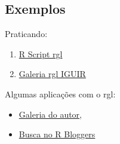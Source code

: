 \subsection*{Exemplos}

\begin{frame}

 Praticando:
  \begin{enumerate}
  \item
    \href{run:./R/rgl/rgl.R}{R Script rgl}
  \item 
	\href{run:./rgl/RGL.html}{Galeria rgl IGUIR}
  \end{enumerate}

  \vspace{0.5cm}
  Algumas aplicações com o rgl:
  \begin{itemize}
  \item \href{http://cran.r-project.org/web/packages/rgl/vignettes/}{Galeria
      do autor},
  \item \href{http://www.r-bloggers.com/?s=rgl}{Busca no R
      Bloggers}
  \end{itemize}

\end{frame}
